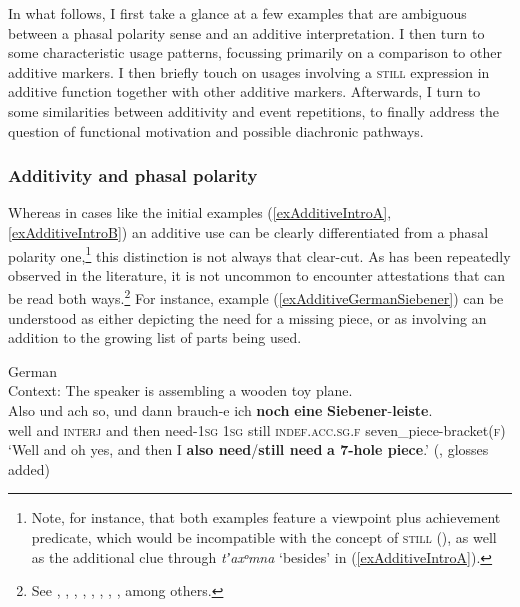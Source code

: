 In what follows, I first take a glance at a few examples that are ambiguous between a phasal polarity sense and an additive interpretation. I then turn to some characteristic usage patterns, focussing primarily on a comparison to other additive markers. I then briefly touch on usages involving a \textsc{still} expression in additive function together with other additive markers. Afterwards, I turn to some similarities between additivity and event repetitions, to finally address the question of functional motivation and possible diachronic pathways.


\subsubsection{Additivity and phasal polarity} Whereas in cases like the initial examples (\ref{exAdditiveIntroA}, \ref{exAdditiveIntroB}) an additive use can be clearly differentiated from a phasal polarity one,\footnote{Note, for instance, that both examples feature a  viewpoint plus achievement predicate, which would be incompatible with the concept of \textsc{still} (), as well as the additional clue through \textit{tʼaxᵒmna} \lq besides\rq{ }in (\ref{exAdditiveIntroA}).} this distinction is not always that clear-cut. As has been repeatedly observed in the literature, it is not uncommon to encounter attestations that can be read both ways.\footnote{See \textcite{Borillo1984}, \textcite{Bosque2016}, \textcite{Doherty1973}, \textcite[162–164]{MosegaardHansen2008}, \textcite[104–105]{Nederstigt2003}, \textcite[§30.8k]{RAEGramatica}, \textcite{Shetter1966}, \textcite{VictorriFuchs1992}, among others.} For instance, example (\ref{exAdditiveGermanSiebener}) can be understood as either depicting the need for a missing piece, or as involving an addition to the growing list of parts being used.

\begin{exe}
	\ex German\label{exAdditiveGermanSiebener}\\
	Context: The speaker is assembling a wooden toy plane.\\
	\gll Also und {ach so}, und dann brauch-e ich \textbf{noch} \textbf{eine} \textbf{Siebener}-\textbf{leiste}.\\
	well and \textsc{interj} and then need-1\textsc{sg} 1\textsc{sg} still \textsc{indef}.\textsc{acc}.\textsc{sg}.\textsc{f} seven\_piece-bracket(\textsc{f})\\
	\glt \lq Well and oh yes, and then I \textbf{also need}/\textbf{still need} \textbf{a 7-hole piece}.\rq{ }(\cite[104]{Nederstigt2003}, glosses added)
\end{exe}

